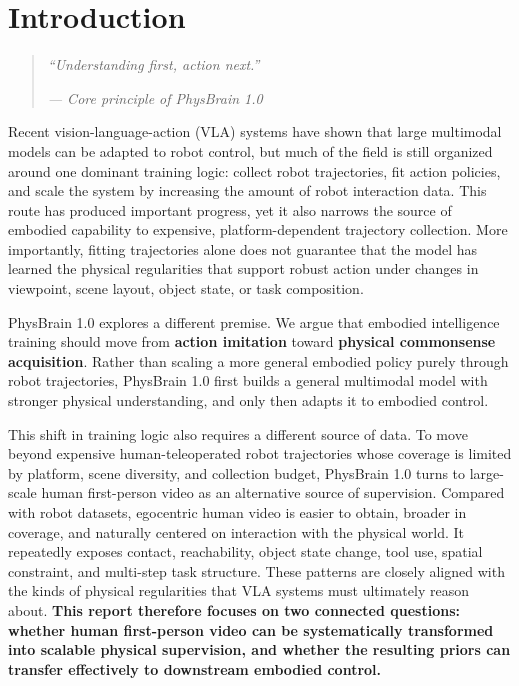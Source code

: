 \documentclass{llmxive}
\begin{document}
\tableofcontents


\section{Introduction}
\label{sec:intro}

\vspace{1mm}
\begin{quote}

\textit{``Understanding first, action next.''}\par
\vspace{-0.4em}

\textit{--- Core principle of PhysBrain 1.0}
\end{quote}

Recent vision-language-action (VLA) systems have shown that large multimodal models can be adapted to robot control, but much of the field is still organized around one dominant training logic: collect robot trajectories, fit action policies, and scale the system by increasing the amount of robot interaction data. This route has produced important progress, yet it also narrows the source of embodied capability to expensive, platform-dependent trajectory collection. More importantly, fitting trajectories alone does not guarantee that the model has learned the physical regularities that support robust action under changes in viewpoint, scene layout, object state, or task composition.

PhysBrain 1.0 explores a different premise. We argue that embodied intelligence training should move from \textbf{action imitation} toward \textbf{physical commonsense acquisition}. Rather than scaling a more general embodied policy purely through robot trajectories, PhysBrain 1.0 first builds a general multimodal model with stronger physical understanding, and only then adapts it to embodied control.

This shift in training logic also requires a different source of data. To move beyond expensive human-teleoperated robot trajectories whose coverage is limited by platform, scene diversity, and collection budget, PhysBrain 1.0 turns to large-scale human first-person video as an alternative source of supervision. Compared with robot datasets, egocentric human video is easier to obtain, broader in coverage, and naturally centered on interaction with the physical world. It repeatedly exposes contact, reachability, object state change, tool use, spatial constraint, and multi-step task structure. These patterns are closely aligned with the kinds of physical regularities that VLA systems must ultimately reason about. \textbf{This report therefore focuses on two connected questions: whether human first-person video can be systematically transformed into scalable physical supervision, and whether the resulting priors can transfer effectively to downstream embodied control.}
\end{document}
